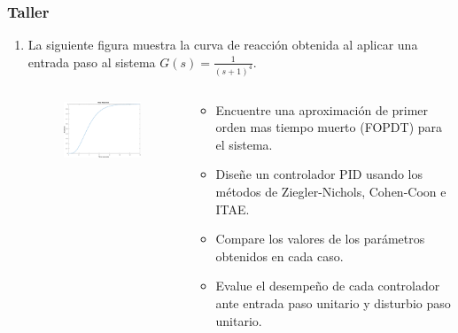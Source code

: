 \documentclass[aspectratio=169,handout]{beamer}
\theoremstyle{definition}
\theoremstyle{plain}
\theoremstyle{remark}
\newcounter{saveenumi}
\newcommand{\seti}{\setcounter{saveenumi}{\value{enumi}}}
\newcommand{\conti}{\setcounter{enumi}{\value{saveenumi}}}
\begin{document}
\begin{frame}[c]\frametitle{Taller}
	\begin{enumerate}
		\conti
		\item La siguiente figura muestra la curva de reacción obtenida al aplicar una entrada paso al sistema $G(s) = \frac{1}{(s+1)^4}$.
		\vspace*{-5mm}
		\begin{columns}
		\begin{column}{0.5\textwidth}
		\begin{figure}
			\includegraphics[width=7cm]{images/responseCurve.eps}
		\end{figure}
		\end{column}	
		\begin{column}{0.5\textwidth}
		\begin{itemize}
			\item Encuentre una aproximación de primer orden mas tiempo muerto (FOPDT) para el sistema.
			\item Diseñe un controlador PID usando los métodos de Ziegler-Nichols, Cohen-Coon e ITAE.
			\item Compare los valores de los parámetros obtenidos en cada caso.
			\item Evalue el desempeño de cada controlador ante entrada paso unitario y disturbio paso unitario.
		\end{itemize}
		\end{column}	
		\end{columns}
		\seti
	\end{enumerate}
\end{frame}
\end{document}
